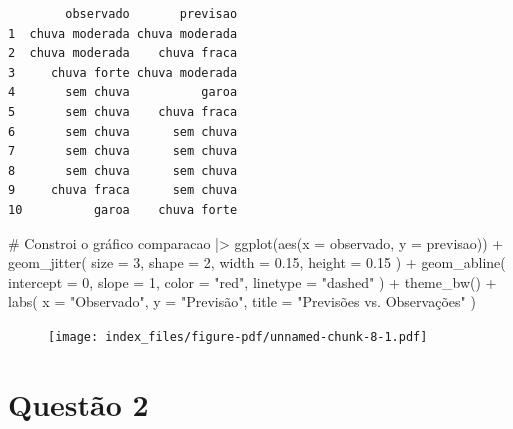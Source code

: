 \documentclass[
  letterpaper,
  DIV=11,
  numbers=noendperiod]{scrreprt}
\newenvironment{Shaded}{\begin{snugshade}}{\end{snugshade}}
\newcommand{\AttributeTok}[1]{\textcolor[rgb]{0.40,0.45,0.13}{#1}}
\newcommand{\CommentTok}[1]{\textcolor[rgb]{0.37,0.37,0.37}{#1}}
\newcommand{\DecValTok}[1]{\textcolor[rgb]{0.68,0.00,0.00}{#1}}
\newcommand{\FloatTok}[1]{\textcolor[rgb]{0.68,0.00,0.00}{#1}}
\newcommand{\FunctionTok}[1]{\textcolor[rgb]{0.28,0.35,0.67}{#1}}
\newcommand{\NormalTok}[1]{\textcolor[rgb]{0.00,0.23,0.31}{#1}}
\newcommand{\SpecialCharTok}[1]{\textcolor[rgb]{0.37,0.37,0.37}{#1}}
\newcommand{\StringTok}[1]{\textcolor[rgb]{0.13,0.47,0.30}{#1}}
\begin{document}
\begin{verbatim}
        observado       previsao
1  chuva moderada chuva moderada
2  chuva moderada    chuva fraca
3     chuva forte chuva moderada
4       sem chuva          garoa
5       sem chuva    chuva fraca
6       sem chuva      sem chuva
7       sem chuva      sem chuva
8       sem chuva      sem chuva
9     chuva fraca      sem chuva
10          garoa    chuva forte
\end{verbatim}

\begin{Shaded}
\begin{Highlighting}[]
\CommentTok{\# Constroi o gráfico}
\NormalTok{comparacao }\SpecialCharTok{|\textgreater{}}
    \FunctionTok{ggplot}\NormalTok{(}\FunctionTok{aes}\NormalTok{(}\AttributeTok{x =}\NormalTok{ observado, }\AttributeTok{y =}\NormalTok{ previsao)) }\SpecialCharTok{+}
    \FunctionTok{geom\_jitter}\NormalTok{(}
        \AttributeTok{size =} \DecValTok{3}\NormalTok{, }\AttributeTok{shape =} \DecValTok{2}\NormalTok{,}
        \AttributeTok{width =} \FloatTok{0.15}\NormalTok{, }\AttributeTok{height =} \FloatTok{0.15}
\NormalTok{    ) }\SpecialCharTok{+}
    \FunctionTok{geom\_abline}\NormalTok{(}
        \AttributeTok{intercept =} \DecValTok{0}\NormalTok{,}
        \AttributeTok{slope =} \DecValTok{1}\NormalTok{,}
        \AttributeTok{color =} \StringTok{"red"}\NormalTok{,}
        \AttributeTok{linetype =} \StringTok{"dashed"}
\NormalTok{    ) }\SpecialCharTok{+}
    \FunctionTok{theme\_bw}\NormalTok{() }\SpecialCharTok{+}
    \FunctionTok{labs}\NormalTok{(}
        \AttributeTok{x =} \StringTok{"Observado"}\NormalTok{,}
        \AttributeTok{y =} \StringTok{"Previsão"}\NormalTok{,}
        \AttributeTok{title =} \StringTok{"Previsões vs. Observações"}
\NormalTok{    )}
\end{Highlighting}
\end{Shaded}

\begin{figure}[H]

{\centering \texttt{[image: index\_files/figure-pdf/unnamed-chunk-8-1.pdf]}

}

\end{figure}


\hypertarget{questuxe3o-2}{%
\chapter*{Questão 2}\label{questuxe3o-2}}
\end{document}
